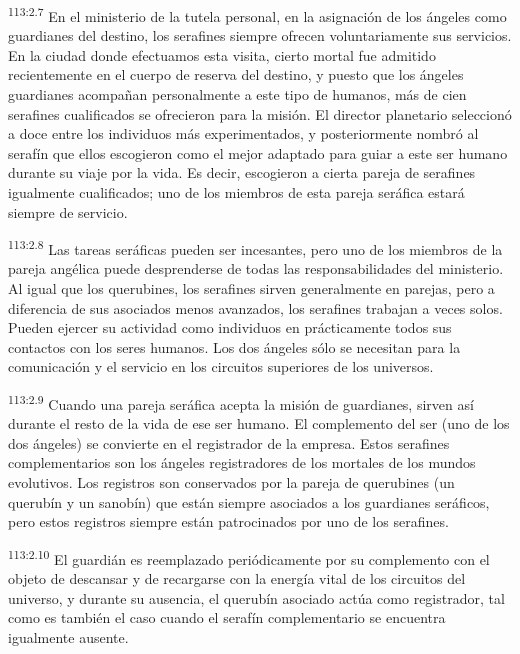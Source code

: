 \par
\textsuperscript{113:2.7} En el ministerio de la tutela personal, en la asignación de los ángeles como guardianes del destino, los serafines siempre ofrecen voluntariamente sus servicios. En la ciudad donde efectuamos esta visita, cierto mortal fue admitido recientemente en el cuerpo de reserva del destino, y puesto que los ángeles guardianes acompañan personalmente a este tipo de humanos, más de cien serafines cualificados se ofrecieron para la misión. El director planetario seleccionó a doce entre los individuos más experimentados, y posteriormente nombró al serafín que ellos escogieron como el mejor adaptado para guiar a este ser humano durante su viaje por la vida. Es decir, escogieron a cierta pareja de serafines igualmente cualificados; uno de los miembros de esta pareja seráfica estará siempre de servicio.

\par
\textsuperscript{113:2.8} Las tareas seráficas pueden ser incesantes, pero uno de los miembros de la pareja angélica puede desprenderse de todas las responsabilidades del ministerio. Al igual que los querubines, los serafines sirven generalmente en parejas, pero a diferencia de sus asociados menos avanzados, los serafines trabajan a veces solos. Pueden ejercer su actividad como individuos en prácticamente todos sus contactos con los seres humanos. Los dos ángeles sólo se necesitan para la comunicación y el servicio en los circuitos superiores de los universos.

\par
\textsuperscript{113:2.9} Cuando una pareja seráfica acepta la misión de guardianes, sirven así durante el resto de la vida de ese ser humano. El complemento del ser (uno de los dos ángeles) se convierte en el registrador de la empresa. Estos serafines complementarios son los ángeles registradores de los mortales de los mundos evolutivos. Los registros son conservados por la pareja de querubines (un querubín y un sanobín) que están siempre asociados a los guardianes seráficos, pero estos registros siempre están patrocinados por uno de los serafines.

\par
\textsuperscript{113:2.10} El guardián es reemplazado periódicamente por su complemento con el objeto de descansar y de recargarse con la energía vital de los circuitos del universo, y durante su ausencia, el querubín asociado actúa como registrador, tal como es también el caso cuando el serafín complementario se encuentra igualmente ausente.

